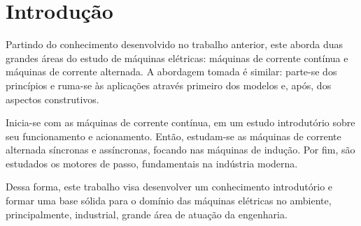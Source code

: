 \section{Introdução}

Partindo do conhecimento desenvolvido no trabalho anterior, este aborda duas grandes áreas do estudo de máquinas elétricas: máquinas de corrente contínua e máquinas de corrente alternada. A abordagem tomada é similar: parte-se dos princípios e ruma-se às aplicações através primeiro dos modelos e, após, dos aspectos construtivos.

Inicia-se com as máquinas de corrente contínua, em um estudo introdutório sobre seu funcionamento e acionamento. Então, estudam-se as máquinas de corrente alternada síncronas e assíncronas, focando nas máquinas de indução. Por fim, são estudados os motores de passo, fundamentais na indústria moderna.

Dessa forma, este trabalho visa desenvolver um conhecimento introdutório e formar uma base sólida para o domínio das máquinas elétricas no ambiente, principalmente, industrial, grande área de atuação da engenharia. 

